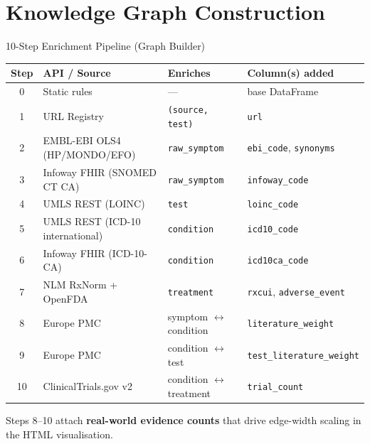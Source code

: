 \documentclass[aspectratio=169]{beamer}
\begin{document}
\section{Knowledge Graph Construction}

\begin{frame}{10-Step Enrichment Pipeline (Graph Builder)}
  \scriptsize
  \begin{tabular}{@{}clll@{}}
    \toprule
    \textbf{Step} & \textbf{API / Source} & \textbf{Enriches} & \textbf{Column(s) added} \\
    \midrule
    0 & Static rules          & ---               & base DataFrame \\
    1 & URL Registry                  & \texttt{(source, test)} & \texttt{url} \\
    2 & EMBL-EBI OLS4 (HP/MONDO/EFO) & \texttt{raw\_symptom} & \texttt{ebi\_code}, \texttt{synonyms} \\
    3 & Infoway FHIR (SNOMED CT CA)  & \texttt{raw\_symptom} & \texttt{infoway\_code} \\
    4 & UMLS REST (LOINC)            & \texttt{test}         & \texttt{loinc\_code} \\
    5 & UMLS REST (ICD-10 international) & \texttt{condition} & \texttt{icd10\_code} \\
    6 & Infoway FHIR (ICD-10-CA)     & \texttt{condition}    & \texttt{icd10ca\_code} \\
    7 & NLM RxNorm + OpenFDA         & \texttt{treatment}    & \texttt{rxcui}, \texttt{adverse\_event} \\
    8 & Europe PMC                   & symptom \(\leftrightarrow\) condition & \texttt{literature\_weight} \\
    9 & Europe PMC                   & condition \(\leftrightarrow\) test & \texttt{test\_literature\_weight} \\
    10 & ClinicalTrials.gov v2       & condition \(\leftrightarrow\) treatment & \texttt{trial\_count} \\
    \bottomrule
  \end{tabular}

  \vspace{0.4em}
  Steps 8--10 attach \textbf{real-world evidence counts} that drive edge-width
  scaling in the HTML visualisation.
\end{frame}
\end{document}
